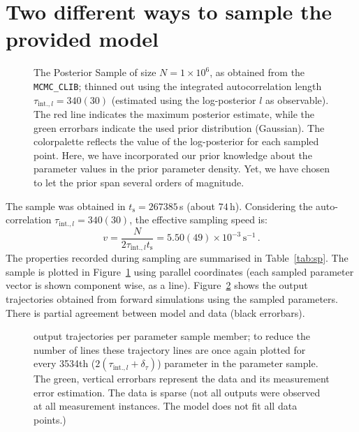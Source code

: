 \documentclass[english]{scrartcl}
\begin{document}
\section{Two different ways to sample the provided model}

\begin{figure}
  \hspace*{-1cm}
  
  \caption{The Posterior Sample of size $N=1\times10^6$, as obtained
    from the \texttt{MCMC\_CLIB}; thinned out using the integrated
    autocorrelation length $\tau_{\text{int.},l}=340(30)$ (estimated
    using the log-posterior $l$ as observable). The red line indicates
    the maximum posterior estimate, while the green errorbars indicate
    the used prior distribution (Gaussian). The colorpalette reflects
    the value of the log-posterior for each sampled point.  Here, we
    have incorporated our prior knowledge about the parameter values
    in the prior parameter density. Yet, we have chosen to let the
    prior span several orders of magnitude.\label{fig:pc-sample}}
\end{figure}

The sample was obtained in $t_{\text{s}}=267385$\,s (about
$74$\,h). Considering the auto-correlation
$\tau_{\text{int.},l}=340(30)$, the effective sampling speed is:
\begin{equation}
  \label{eq:speed}
  v=\frac{N}{2\tau_{\text{int.},l} t_{\text{s}}}=5.50(49)\times 10^{-3}\,\text{s}^{-1}\,.
\end{equation}
The properties recorded during sampling are summarised in
Table~\ref{tab:sp}. The sample is plotted in
Figure~\ref{fig:pc-sample} using parallel coordinates (each sampled
parameter vector is shown component wise, as a
line). Figure~\ref{fig:osmpl} shows the output trajectories obtained
from forward simulations using the sampled parameters. There is
partial agreement between model and data (black errorbars).
\begin{figure}
  \sffamily\tiny
  \hspace*{-3cm}
  \caption{output trajectories per parameter sample member;
    to reduce the number of lines these trajectory lines are once
    again plotted for every 3534th
    ($2(\tau_{\text{int.},l}+\delta_\tau)$) parameter in the parameter
    sample. The green, vertical errorbars represent the data and its
    measurement error estimation. The data is sparse (not all outputs
    were observed at all measurement instances. The model does not fit
    all data points.)\label{fig:osmpl}}
\end{figure}
\end{document}
